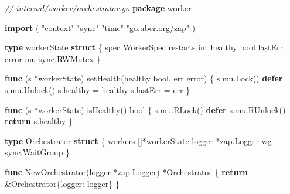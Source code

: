\documentclass[
]{article}
\newenvironment{Shaded}{}{}
\newcommand{\CommentTok}[1]{\textcolor[rgb]{0.38,0.63,0.69}{\textit{#1}}}
\newcommand{\ControlFlowTok}[1]{\textcolor[rgb]{0.00,0.44,0.13}{\textbf{#1}}}
\newcommand{\DataTypeTok}[1]{\textcolor[rgb]{0.56,0.13,0.00}{#1}}
\newcommand{\KeywordTok}[1]{\textcolor[rgb]{0.00,0.44,0.13}{\textbf{#1}}}
\newcommand{\NormalTok}[1]{#1}
\newcommand{\OperatorTok}[1]{\textcolor[rgb]{0.40,0.40,0.40}{#1}}
\newcommand{\StringTok}[1]{\textcolor[rgb]{0.25,0.44,0.63}{#1}}
\begin{document}
\begin{Shaded}
\begin{Highlighting}[]
\CommentTok{// internal/worker/orchestrator.go}
\KeywordTok{package}\NormalTok{ worker}

\KeywordTok{import} \OperatorTok{(}
    \StringTok{"context"}
    \StringTok{"sync"}
    \StringTok{"time"}
    \StringTok{"go.uber.org/zap"}
\OperatorTok{)}

\KeywordTok{type}\NormalTok{ workerState }\KeywordTok{struct} \OperatorTok{\{}
\NormalTok{    spec     WorkerSpec}
\NormalTok{    restarts }\DataTypeTok{int}
\NormalTok{    healthy  }\DataTypeTok{bool}
\NormalTok{    lastErr  }\DataTypeTok{error}
\NormalTok{    mu       sync}\OperatorTok{.}\NormalTok{RWMutex}
\OperatorTok{\}}

\KeywordTok{func} \OperatorTok{(}\NormalTok{s }\OperatorTok{*}\NormalTok{workerState}\OperatorTok{)}\NormalTok{ setHealth}\OperatorTok{(}\NormalTok{healthy }\DataTypeTok{bool}\OperatorTok{,}\NormalTok{ err }\DataTypeTok{error}\OperatorTok{)} \OperatorTok{\{}
\NormalTok{    s}\OperatorTok{.}\NormalTok{mu}\OperatorTok{.}\NormalTok{Lock}\OperatorTok{()}
    \ControlFlowTok{defer}\NormalTok{ s}\OperatorTok{.}\NormalTok{mu}\OperatorTok{.}\NormalTok{Unlock}\OperatorTok{()}
\NormalTok{    s}\OperatorTok{.}\NormalTok{healthy }\OperatorTok{=}\NormalTok{ healthy}
\NormalTok{    s}\OperatorTok{.}\NormalTok{lastErr }\OperatorTok{=}\NormalTok{ err}
\OperatorTok{\}}

\KeywordTok{func} \OperatorTok{(}\NormalTok{s }\OperatorTok{*}\NormalTok{workerState}\OperatorTok{)}\NormalTok{ isHealthy}\OperatorTok{()} \DataTypeTok{bool} \OperatorTok{\{}
\NormalTok{    s}\OperatorTok{.}\NormalTok{mu}\OperatorTok{.}\NormalTok{RLock}\OperatorTok{()}
    \ControlFlowTok{defer}\NormalTok{ s}\OperatorTok{.}\NormalTok{mu}\OperatorTok{.}\NormalTok{RUnlock}\OperatorTok{()}
    \ControlFlowTok{return}\NormalTok{ s}\OperatorTok{.}\NormalTok{healthy}
\OperatorTok{\}}

\KeywordTok{type}\NormalTok{ Orchestrator }\KeywordTok{struct} \OperatorTok{\{}
\NormalTok{    workers }\OperatorTok{[]*}\NormalTok{workerState}
\NormalTok{    logger  }\OperatorTok{*}\NormalTok{zap}\OperatorTok{.}\NormalTok{Logger}
\NormalTok{    wg      sync}\OperatorTok{.}\NormalTok{WaitGroup}
\OperatorTok{\}}

\KeywordTok{func}\NormalTok{ NewOrchestrator}\OperatorTok{(}\NormalTok{logger }\OperatorTok{*}\NormalTok{zap}\OperatorTok{.}\NormalTok{Logger}\OperatorTok{)} \OperatorTok{*}\NormalTok{Orchestrator }\OperatorTok{\{}
    \ControlFlowTok{return} \OperatorTok{\&}\NormalTok{Orchestrator}\OperatorTok{\{}\NormalTok{logger}\OperatorTok{:}\NormalTok{ logger}\OperatorTok{\}}
\OperatorTok{\}}


\end{Highlighting}
\end{Shaded}
\end{document}
